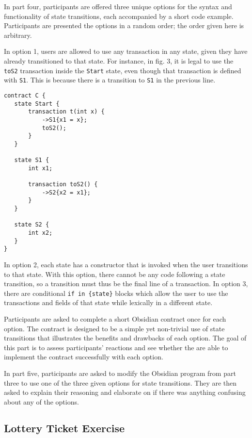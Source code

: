 \documentclass[sigplan,10pt,review,anonymous]{acmart}\settopmatter{printfolios=true}
\begin{document}
In part four, participants are offered three unique options for the syntax and functionality of state transitions, each 
accompanied by a short code example. Participants are presented the options in a random order; the order given 
here is arbitrary.

In option 1, users are allowed to use any transaction in any state, given they have already transitioned to that 
state. For instance, in fig. 3, it is legal to use the \texttt{\small{toS2}} transaction inside the \texttt{\small{Start}} 
state, even though that transaction is defined with \texttt{\small{S1}}. This is because there is a transition to 
\texttt{\small{S1}} in the previous line.

\begin{lstlisting}[caption={One option for state transitions},captionpos=b]
contract C {
   state Start {
       transaction t(int x) {
           ->S1{x1 = x};
           toS2();
       }
   }

   state S1 {
       int x1;

       transaction toS2() {
           ->S2{x2 = x1};
       }
   }

   state S2 {
       int x2;
   }
}
\end{lstlisting}

In option 2, each state has a constructor that is invoked when the user transitions to that state. With this
option, there cannot be any code following a state transition, so a transition must thus be the final line of a 
transaction. In option 3, there are conditional \texttt{\small{if in \{state\}}} blocks which allow the user
to use the transactions and fields of that state while lexically in a different state. 

Participants are asked to complete a short Obsidian contract once for each option. The contract is 
designed to be a simple yet non-trivial use of state transitions that illustrates the benefits and drawbacks of each 
option. The goal of this part is to assess participants' reactions and see whether the are able to implement the 
contract successfully with each option.

In part five, participants are asked to modify the Obsidian program from part three to use one of the three given 
options for state transitions. They are then asked to explain their reasoning and elaborate on if there was 
anything confusing about any of the options. 

\subsection{Lottery Ticket Exercise}
	
\end{document}
